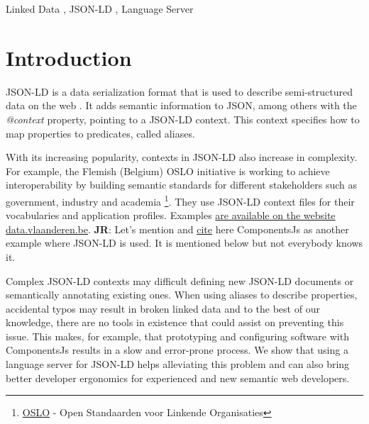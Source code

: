 \documentclass[
]{ceurart}
\newcommand\jr[1]{{\color{Red}\textbf{JR}: #1}}
\begin{document}
\begin{keywords}
  Linked Data \sep 
  JSON-LD \sep
  Language Server
\end{keywords}

\maketitle

\section{Introduction}

JSON-LD is a data serialization format that is used to describe semi-structured data on the web \cite{JSON-LD-W3C}.
It adds semantic information to JSON, among others with the \textit{@context} property, pointing to a JSON-LD context.
This context specifies how to map properties to predicates, called aliases.

With its increasing popularity, contexts in JSON-LD also increase in complexity.
For example, the Flemish (Belgium) OSLO initiative is working to achieve interoperability by building semantic standards for different stakeholders such as government, industry and academia \footnote{\href{https://www.vlaanderen.be/digitaal-vlaanderen/onze-oplossingen/oslo}{OSLO} - Open Standaarden voor Linkende Organisaties}.
They use JSON-LD context files for their vocabularies and application profiles. Examples \href{https://data.vlaanderen.be}{are available on the website data.vlaanderen.be}.
\jr{Let's mention and \href{https://www.semantic-web-journal.net/content/componentsjs-semantic-dependency-injection-0}{cite} here ComponentsJs as another example where JSON-LD is used. It is mentioned below but not everybody knows it.}

Complex JSON-LD contexts may difficult defining new JSON-LD documents or semantically annotating existing ones. 
When using aliases to describe properties, accidental typos may result in broken linked data and to the best of our knowledge, there are no tools in existence that could assist on preventing this issue.
This makes, for example, that prototyping and configuring software with ComponentsJs results in a slow and error-prone process.
We show that using a language server for JSON-LD helps alleviating this problem and can also bring better developer ergonomics for experienced and new semantic web developers.
\end{document}
